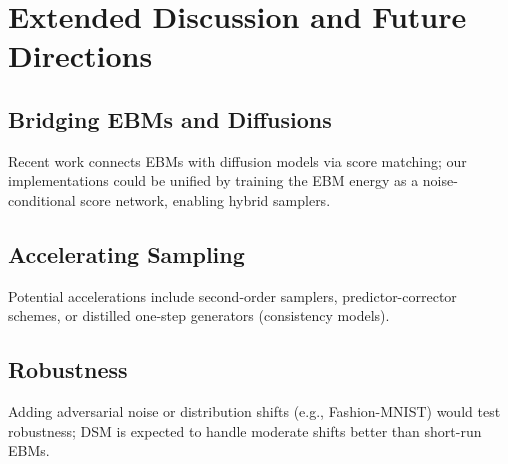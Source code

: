 \documentclass[conference]{IEEEtran}
\begin{document}
\section{Extended Discussion and Future Directions}
\subsection{Bridging EBMs and Diffusions}
Recent work connects EBMs with diffusion models via score matching; our implementations could be unified by training the EBM energy as a noise-conditional score network, enabling hybrid samplers.
\subsection{Accelerating Sampling}
Potential accelerations include second-order samplers, predictor-corrector schemes, or distilled one-step generators (consistency models).
\subsection{Robustness}
Adding adversarial noise or distribution shifts (e.g., Fashion-MNIST) would test robustness; DSM is expected to handle moderate shifts better than short-run EBMs.
\end{document}
